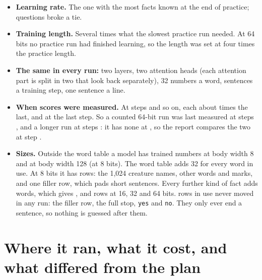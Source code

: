 \documentclass[10pt,letterpaper]{article}
\newcommand{\s}[1]{\texttt{#1}}                  %
\newcommand{\lead}[1]{\textbf{#1}}               %
\begin{document}
\begin{itemize}
\item \lead{Learning rate.} The one with the most facts known at the end of practice; questions
      broke a tie.
\item \lead{Training length.} Several times what the slowest practice run needed. At 64 bits no
      practice run had finished learning, so the length was set at four times the practice length.
\item \lead{The same in every run:} two layers, two attention heads (each attention part is
      split in two that look back separately), 32 numbers a word, \SentencesPerStep{} sentences a
      training step, one sentence a line.
\item \lead{When scores were measured.} At steps \FirstSteps{} and so on, each about \StepRatio{}
      times the last, and at the last step. So a counted 64-bit run was last measured at steps
      \CountedLastSteps, and a longer run at steps \LongerLastSteps: it has none at
      \StepsSixtyFour, so the report compares the two at step \StepsShared.
\item \lead{Sizes.} Outside the word table a model has \OutsideNarrow{} trained numbers at body width
      8 and \OutsideWide{} at body width 128 (at 8 bits). The word table adds 32 for every word in
      use. At 8 bits it has \TableRowsEight{} rows: the 1,024 creature names, \OtherWords{} other
      words and marks, and one filler row, which pads short sentences. Every further kind of fact
      adds \WordsPerKind{} words, which gives \TableRowsSixteen, \TableRowsThirtyTwo{} and
      \TableRowsSixtyFour{} rows at 16, 32 and 64 bits. \RowsNeverChangedWordCap{} rows in use
      never moved in any run: the filler row, the full stop, \s{yes} and \s{no}. They only ever
      end a sentence, so nothing is guessed after them.
\end{itemize}

\section{Where it ran, what it cost, and what differed from the plan}
\end{document}
